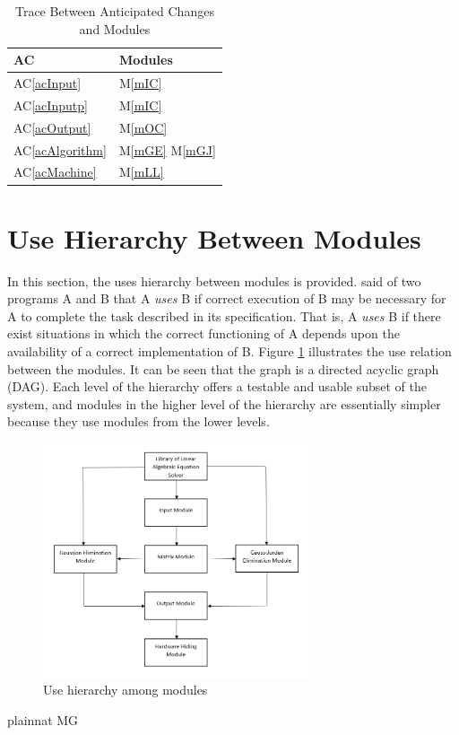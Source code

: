 \documentclass[12pt, titlepage]{article}
\newcommand{\acref}[1]{AC\ref{#1}}
\newcommand{\mref}[1]{M\ref{#1}}
\begin{document}
\begin{table}[H]
\centering
\begin{tabular}{p{} p{}}
\toprule
\textbf{AC} & \textbf{Modules}\\
\midrule
\acref{acInput} & \mref{mIC}\\
\acref{acInputp} & \mref{mIC}\\
\acref{acOutput} & \mref{mOC}\\
\acref{acAlgorithm} & \mref{mGE} \mref{mGJ}\\
\acref{acMachine} & \mref{mLL}\\

\bottomrule
\end{tabular}
\caption{Trace Between Anticipated Changes and Modules}
\label{TblACT}
\end{table}

\section{Use Hierarchy Between Modules} \label{SecUse}

In this section, the uses hierarchy between modules is
provided. \citet{Parnas1978} said of two programs A and B that A {\em uses} B if
correct execution of B may be necessary for A to complete the task described in
its specification. That is, A {\em uses} B if there exist situations in which
the correct functioning of A depends upon the availability of a correct
implementation of B.  Figure \ref{FigUH} illustrates the use relation between
the modules. It can be seen that the graph is a directed acyclic graph
(DAG). Each level of the hierarchy offers a testable and usable subset of the
system, and modules in the higher level of the hierarchy are essentially simpler
because they use modules from the lower levels.

\begin{figure}[H]
\centering
\includegraphics[width=0.7\textwidth]{UsesHierarchy.PNG}
\caption{Use hierarchy among modules}
\label{FigUH}
\end{figure}


 {plainnat}
 {MG}
\end{document}
